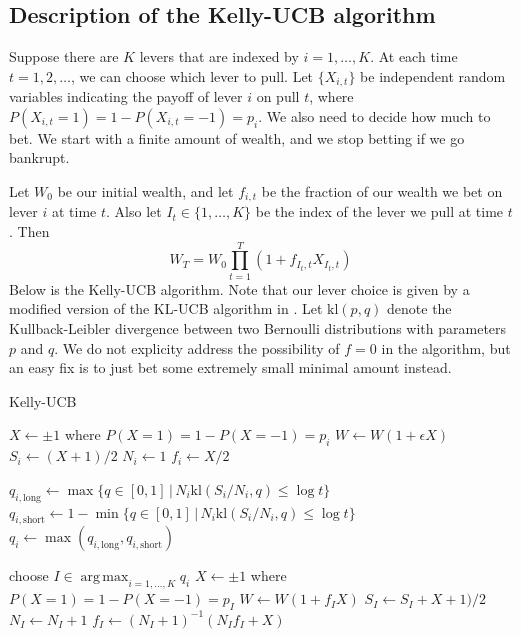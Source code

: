 \documentclass[letterpaper]{article}
\DeclareMathOperator*{\argmax}{arg\,max}
\numberwithin{equation}{section}
\theoremstyle{plain}
\begin{document}
\subsection{Description of the Kelly-UCB algorithm}
Suppose there are $K$ levers that are indexed by $i=1,\ldots, K$. At each time $t=1,2,\ldots$, we can choose which lever to pull. Let $\{X_{i,t}\}$ be independent random variables indicating the payoff of lever $i$ on pull $t$, where $P(X_{i,t}=1) = 1-P(X_{i,t}=-1) = p_i$. We also need to decide how much to bet. We start with a finite amount of wealth, and we stop betting if we go bankrupt.

Let $W_0$ be our initial wealth, and let $f_{i,t}$ be the fraction of our wealth we bet on lever $i$ at time $t$. Also let $I_t\in\{1,\ldots,K\}$ be the index of the lever we pull at time $t$. Then
\begin{equation}\label{eq:wealth_def}
W_T = W_0 \prod_{t=1}^T (1+f_{I_t, t}X_{I_t,t})
\end{equation}
Below is the Kelly-UCB algorithm. Note that our lever choice is given by a modified version of the KL-UCB algorithm in \cite{cappe2013kullback}. Let $\text{kl}(p,q)$ denote the Kullback-Leibler divergence between two Bernoulli distributions with parameters $p$ and $q$. We do not explicity address the possibility of $f=0$ in the algorithm, but an easy fix is to just bet some extremely small minimal amount instead.

\begin{algorithm}
\caption{Kelly-UCB}\label{alg:kl_ucb}
\begin{algorithmic}[1]
\State $X \gets \pm 1$ where $P(X=1) = 1-P(X=-1) = p_i$
\State $W \gets W(1+\epsilon X)$
\State $S_i \gets (X+1)/2$
\State $N_i \gets 1$
\State $f_i \gets X/2$
\EndFor


\State $q_{i,\text{long}} \gets \max\{q\in[0,1]\,|\,N_i \text{kl}(S_i/N_i, q) \le \log t\}$
\State $q_{i,\text{short}} \gets 1-\min\{q\in[0,1]\,|\,N_i \text{kl}(S_i/N_i, q) \le \log t\}$
\State $q_i \gets \max(q_{i,\text{long}}, q_{i,\text{short}})$
\EndFor

\State choose $I \in \argmax_{i=1,\ldots,K} q_i$
\State $X \gets \pm 1$ where $P(X=1) = 1-P(X=-1) = p_I$
\State $W \gets W(1+ f_I X)$ %
\State $S_I \gets S_I + X+1)/2$
\State $N_I \gets N_I + 1$
\State $f_I \gets (N_I+1)^{-1}(N_If_I + X)$
\EndFor
\end{algorithmic}
\end{algorithm}
\end{document}

